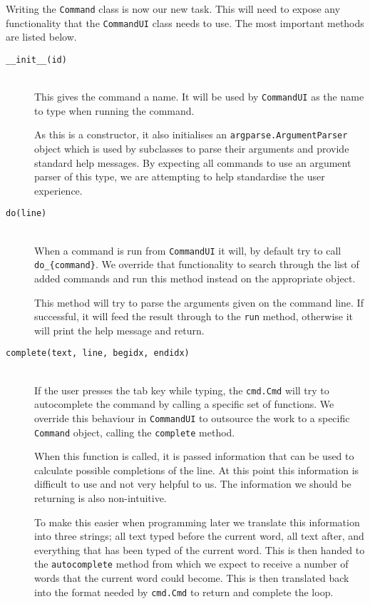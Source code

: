 \documentclass{report}
\begin{document}
Writing the \texttt{Command} class is now our new task. This will need to expose any functionality that the \texttt{CommandUI} class needs to use. The
most important methods are listed below.

\begin{description}
\item[\texttt{\_\_init\_\_(id)}] \hfill \\
This gives the command a name. It will be used by \texttt{CommandUI} as the name to type when running the command.

As this is a constructor, it also initialises an \texttt{argparse.ArgumentParser} object which is used by subclasses to parse their arguments and
provide standard help messages. By expecting all commands to use an argument parser of this type, we are attempting to help standardise the user
experience.

\item[\texttt{do(line)}] \hfill \\
When a command is run from \texttt{CommandUI} it will, by default try to call \texttt{do\_\{command\}}. We override that functionality to search
through the list of added commands and run this method instead on the appropriate object.

This method will try to parse the arguments given on the command line. If successful, it will feed the result through to the \texttt{run} method,
otherwise it will print the help message and return.

\item[\texttt{complete(text, line, begidx, endidx)}] \hfill \\
If the user presses the tab key while typing, the \texttt{cmd.Cmd} will try to autocomplete the command by calling a specific set of functions. We
override this behaviour in \texttt{CommandUI} to outsource the work to a specific \texttt{Command} object, calling the \texttt{complete} method.

When this function is called, it is passed information that can be used to calculate possible completions of the line. At this point this information
is difficult to use and not very helpful to us. The information we should be returning is also non-intuitive.

To make this easier when programming later we translate this information into three strings; all text typed before the current word, all text after,
and everything that has been typed of the current word. This is then handed to the \texttt{autocomplete} method from which we
expect to receive a number of words that the current word could become. This is then translated back into the format needed by \texttt{cmd.Cmd} to
return and complete the loop.


\end{description}
\end{document}
